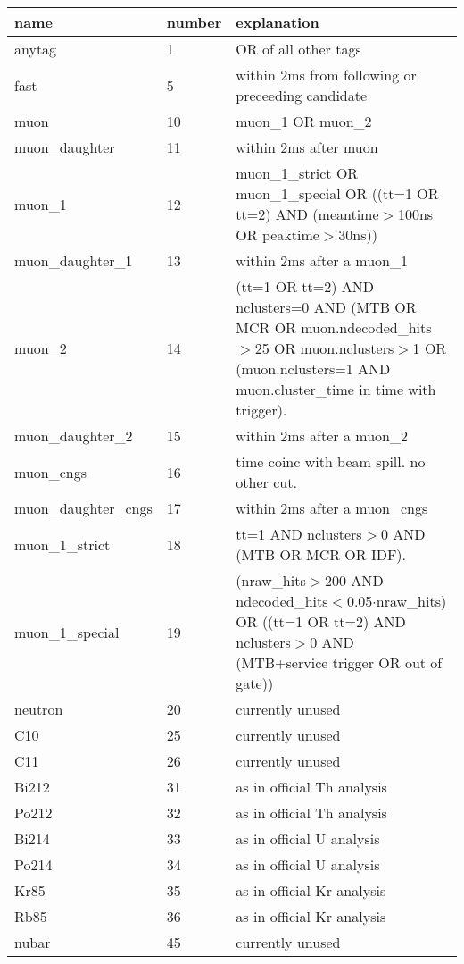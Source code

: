 \begin{sidewaystable}
\begin{tabular}{llp{16cm}}
name&number&explanation\\
\hline
anytag               & 1  &OR of all other tags\\
fast                 & 5  &within 2ms from following or preceeding candidate\\
muon		     & 10 &muon\_1 OR muon\_2\\
muon\_daughter	     & 11 &within 2ms after muon\\
muon\_1		     & 12 &muon\_1\_strict OR muon\_1\_special OR ((tt=1 OR tt=2) AND (meantime$>$100ns OR peaktime$>$30ns))\\
muon\_daughter\_1    & 13 &within 2ms after a muon\_1\\
muon\_2		     & 14 &(tt=1 OR tt=2) AND nclusters=0 AND (MTB OR MCR OR muon.ndecoded\_hits$>$25 OR muon.nclusters$>$1 OR (muon.nclusters=1 AND muon.cluster\_time in time with trigger).\\
muon\_daughter\_2    & 15 &within 2ms after a muon\_2 \\
muon\_cngs	     & 16 &time coinc with beam spill. no other cut.\\
muon\_daughter\_cngs & 17 &within 2ms after a muon\_cngs\\
muon\_1\_strict	     & 18 &tt=1 AND nclusters$>$0 AND (MTB OR MCR OR IDF).\\
muon\_1\_special     & 19 &(nraw\_hits$>$200 AND ndecoded\_hits$<$0.05$\cdot$nraw\_hits) OR ((tt=1 OR tt=2) AND nclusters$>$0 AND (MTB+service trigger OR out of gate))\\
neutron		     & 20 &currently unused\\
C10		     & 25 &currently unused\\
C11  		     & 26 &currently unused\\	 
Bi212		     & 31 &as in official Th analysis\\
Po212		     & 32 &as in official Th analysis\\
Bi214		     & 33 &as in official U analysis\\
Po214		     & 34 &as in official U analysis\\
Kr85 		     & 35 &as in official Kr analysis\\
Rb85		     & 36 &as in official Kr analysis\\
nubar		     & 45 &currently unused\\
\hline
\end{tabular}
\end{sidewaystable}
